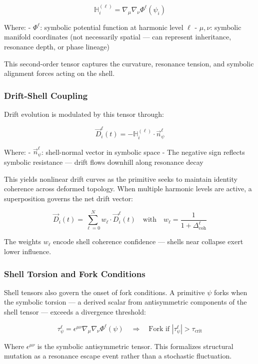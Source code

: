 \documentclass[12pt]{article}
\begin{document}
\[
\mathbb{H}_i^{(\ell)} = \nabla_{\mu} \nabla_{\nu} \Phi^\ell(\psi_i)
\]

Where:
- \( \Phi^\ell \): symbolic potential function at harmonic level \( \ell \)
- \( \mu, \nu \): symbolic manifold coordinates (not necessarily spatial — can represent inheritance, resonance depth, or phase lineage)

This second-order tensor captures the curvature, resonance tension, and symbolic alignment forces acting on the shell.

\subsubsection{Drift-Shell Coupling}

Drift evolution is modulated by this tensor through:

\[
\vec{D}_i^\ell(t) = -\mathbb{H}_i^{(\ell)} \cdot \vec{n}_\psi^\ell
\]

Where:
- \( \vec{n}_\psi^\ell \): shell-normal vector in symbolic space
- The negative sign reflects symbolic resistance — drift flows downhill along resonance decay

This yields nonlinear drift curves as the primitive seeks to maintain identity coherence across deformed topology. When multiple harmonic levels are active, a superposition governs the net drift vector:

\[
\vec{D}_i(t) = \sum_{\ell=0}^{N} w_\ell \cdot \vec{D}_i^\ell(t)
\quad \text{with} \quad w_\ell = \frac{1}{1 + \Delta_{\text{coh}}^\ell}
\]

The weights \( w_\ell \) encode shell coherence confidence — shells near collapse exert lower influence.

\subsubsection{Shell Torsion and Fork Conditions}

Shell tensors also govern the onset of fork conditions. A primitive \( \psi \) forks when the symbolic torsion — a derived scalar from antisymmetric components of the shell tensor — exceeds a divergence threshold:

\[
\tau_\psi^\ell = \epsilon^{\mu\nu} \nabla_{\mu} \nabla_{\nu} \Phi^\ell(\psi)
\quad \Rightarrow \quad \text{Fork if } \left| \tau_\psi^\ell \right| > \tau_{\text{crit}}
\]

Where \( \epsilon^{\mu\nu} \) is the symbolic antisymmetric tensor. This formalizes structural mutation as a resonance escape event rather than a stochastic fluctuation.
\end{document}
